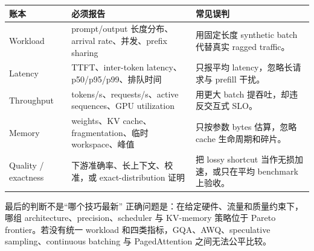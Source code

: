 \documentclass[a4paper]{article}
\begin{document}
\begin{longtable}{p{}p{}p{}}
\toprule
\textbf{账本} & \textbf{必须报告} & \textbf{常见误判} \\
\midrule
Workload & prompt/output 长度分布、arrival rate、并发、prefix sharing & 用固定长度 synthetic batch 代替真实 ragged traffic。 \\
Latency & TTFT、inter-token latency、p50/p95/p99、排队时间 & 只报平均 latency，忽略长请求与 prefill 干扰。 \\
Throughput & tokens/s、requests/s、active sequences、GPU utilization & 用更大 batch 提吞吐，却违反交互式 SLO。 \\
Memory & weights、KV cache、fragmentation、临时 workspace、峰值 & 只按参数 bytes 估算，忽略 cache 生命周期和碎片。 \\
Quality / exactness & 下游准确率、长上下文、校准，或 exact-distribution 证明 & 把 lossy shortcut 当作无损加速，或只在平均 benchmark 上验收。 \\
\bottomrule
\end{longtable}

\begin{warningbox}{最后的判断不是“哪个技巧最新”}
正确问题是：在给定硬件、流量和质量约束下，哪组 architecture、precision、scheduler 与 KV-memory 策略位于 Pareto frontier。若没有统一 workload 和四类指标，GQA、AWQ、speculative sampling、continuous batching 与 PagedAttention 之间无法公平比较。
\end{warningbox}
\end{document}
